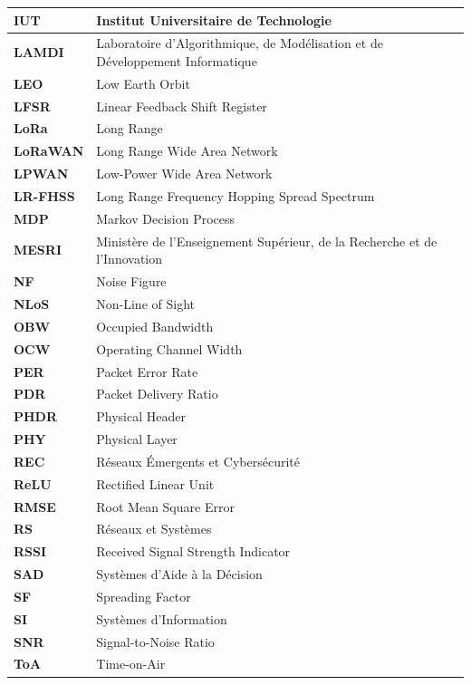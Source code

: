 \begin{longtable}{|>{\centering\arraybackslash}p{4cm}|p{10cm}|}
	\hline
	\textbf{IUT} & Institut Universitaire de Technologie \\
	\hline
	\textbf{LAMDI} & Laboratoire d'Algorithmique, de Modélisation et de Développement Informatique \\
	\hline
	\textbf{LEO} & Low Earth Orbit \\
	\hline
	\textbf{LFSR} & Linear Feedback Shift Register \\
	\hline
	\textbf{LoRa} & Long Range \\
	\hline
	\textbf{LoRaWAN} & Long Range Wide Area Network \\
	\hline
	\textbf{LPWAN} & Low-Power Wide Area Network \\
	\hline
	\textbf{LR-FHSS} & Long Range Frequency Hopping Spread Spectrum \\
	\hline
	\textbf{MDP} & Markov Decision Process \\
	\hline
	\textbf{MESRI} & Ministère de l'Enseignement Supérieur, de la Recherche et de l'Innovation \\
	\hline
	\textbf{NF} & Noise Figure \\
	\hline
	\textbf{NLoS} & Non-Line of Sight \\
	\hline
	\textbf{OBW} & Occupied Bandwidth \\
	\hline
	\textbf{OCW} & Operating Channel Width \\
	\hline
	\textbf{PER} & Packet Error Rate \\
	\hline
	\textbf{PDR} & Packet Delivery Ratio \\
	\hline
	\textbf{PHDR} & Physical Header \\
	\hline
	\textbf{PHY} & Physical Layer \\
	\hline
	\textbf{REC} & Réseaux Émergents et Cybersécurité \\
	\hline
	\textbf{ReLU} & Rectified Linear Unit \\
	\hline
	\textbf{RMSE} & Root Mean Square Error \\
	\hline
	\textbf{RS} & Réseaux et Systèmes \\
	\hline
	\textbf{RSSI} & Received Signal Strength Indicator \\
	\hline
	\textbf{SAD} & Systèmes d'Aide à la Décision \\
	\hline
	\textbf{SF} & Spreading Factor \\
	\hline
	\textbf{SI} & Systèmes d'Information \\
	\hline
	\textbf{SNR} & Signal-to-Noise Ratio \\
	\hline
	\textbf{ToA} & Time-on-Air \\

\end{longtable}
